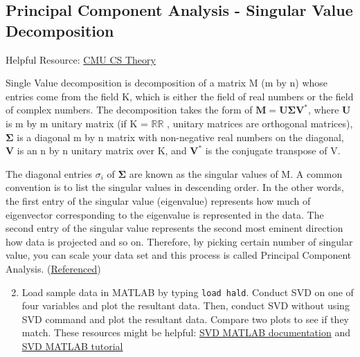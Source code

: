 \documentclass{tufte-handout}
\begin{document}
\subsection{Principal Component Analysis - Singular Value Decomposition}
Helpful Resource: 
\href{https://www.cs.cmu.edu/~venkatg/teaching/CStheory-infoage/book-chapter-4.pdf}{CMU CS Theory}

Single Value decomposition is decomposition of a matrix M (m by n) whose entries come from the field K, which is either the field of real numbers or the field of complex numbers. The decomposition takes the form of ${\displaystyle \mathbf {M} =\mathbf {U} {\boldsymbol {\Sigma }}\mathbf {V} ^{*}}$, where $\mathbf{U}$ is m by m unitary matrix (if  K = ${\displaystyle \mathbb {R} } \mathbb {R}$ , unitary matrices are orthogonal matrices), $\boldsymbol{{\Sigma}}$ is a diagonal m by n matrix with non-negative real numbers on the diagonal, $\mathbf{V}$ is an n by n unitary matrix over K, and
$\mathbf{{V}^{*}}$ is the conjugate transpose of V.

The diagonal entries ${\sigma_{i}}$ of $\mathbf{\Sigma}$ are known as the singular values of M. A common convention is to list the singular values in descending order. In the other words, the first entry of the singular value (eigenvalue) represents how much of eigenvector corresponding to the eigenvalue is represented in the data. The second entry of the singular value represents the second most eminent direction how data is projected and so on. Therefore, by picking certain number of singular value, you can scale your data set and this process is called Principal Component Analysis. (\href{https://en.wikipedia.org/wiki/Singular-value_decomposition}{Referenced})



\begin{enumerate}
	\setcounter{enumi}{1}
	\item Load sample data in MATLAB by typing \verb|load hald|. Conduct SVD on one of four variables and plot the resultant data. Then, conduct SVD without using SVD command and plot the resultant data. Compare two plots to see if they match. These resources might be helpful: \href{https://www.mathworks.com/help/matlab/ref/svd.html}{SVD MATLAB documentation} and \href{http://www.matrixlab-examples.com/singular-value-decomposition.html}{SVD MATLAB tutorial}

\end{enumerate}


\end{document}
